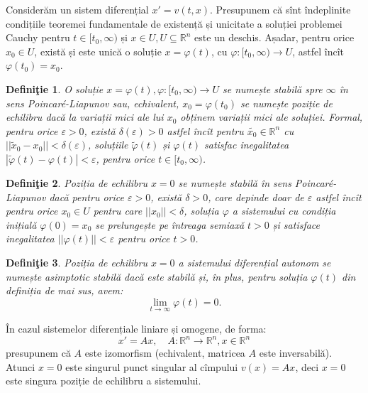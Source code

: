 \documentclass[11pt,a4paper]{article}
\newcommand\seq{\subseteq}
\newcommand\RR{\mathbb{R}}
\theoremstyle{dotless}
\theoremstyle{dotlessdr}
\newtheorem{definition}{Defini\c{t}ie}[section]
\begin{document}
Considerăm un sistem diferențial $x' = v(t, x)$. Presupunem că sînt îndeplinite
condițiile teoremei fundamentale de existență și unicitate a soluției problemei
Cauchy pentru $t \in [t_0, \infty)$ și $x \in U, U \seq \RR^n$ este un deschis.
Așadar, pentru orice $x_0 \in U$, există și este unică o soluție $x = \varphi(t)$,
cu $\varphi : [t_0, \infty) \to U$, astfel încît $\varphi(t_0) = x_0$.

\begin{definition}\label{def:stabila-PL}
  O soluție $x = \varphi(t), \varphi : [t_0, \infty) \to U$ se numește \emph{stabilă %
    spre $\infty$ în sens Poincar\'{e}-Liapunov} sau, echivalent, $x_0 = \varphi(t_0)$
  se numește \emph{poziție de echilibru} dacă la variații mici ale lui $x_0$ obținem
  variații mici ale soluției. Formal, pentru orice $\varepsilon > 0$, există
  $\delta(\varepsilon) > 0$ astfel încît pentru $\widetilde{x_0}\in\RR^n$ cu
  $||\widetilde{x}_0 - x_0|| < \delta(\varepsilon)$, soluțiile $\widetilde{\varphi}(t)$
  și $\varphi(t)$ satisfac inegalitatea $|\widetilde{\varphi}(t) - \varphi(t)| < \varepsilon$,
  pentru orice $t \in [t_0, \infty)$.
\end{definition}

\begin{definition}\label{def:stabila-0}
  Poziția de echilibru $x = 0$ se numește \emph{stabilă în sens Poincar\'{e}-Liapunov}
  dacă pentru orice $\varepsilon > 0$, există $\delta > 0$, care depinde doar de
  $\varepsilon$ astfel încît pentru orice $x_0 \in U$ pentru care $||x_0|| < \delta$,
  soluția $\varphi$ a sistemului cu condiția inițială $\varphi(0) = x_0$ se prelungește
  pe întreaga semiaxă $t > 0$ și satisface inegalitatea $||\varphi(t)|| < \varepsilon$
  pentru orice $t > 0$.
\end{definition}

\begin{definition}\label{def:as-stabila}
  Poziția de echilibru $x = 0$ a sistemului diferențial autonom se numește
  \emph{asimptotic stabilă} dacă este stabilă și, în plus, pentru soluția $\varphi(t)$
  din definiția de mai sus, avem:
  \[
    \lim_{t \to \infty} \varphi(t) = 0.
  \]
\end{definition}

În cazul sistemelor diferențiale liniare și omogene, de forma:
\[
  x' = Ax, \quad A : \RR^n \to \RR^n, x \in \RR^n
\]
presupunem că $A$ este izomorfism (echivalent, matricea $A$ este inversabilă).
Atunci $x = 0$ este singurul punct singular al cîmpului $v(x) = Ax$, deci $x = 0$
este singura poziție de echilibru a sistemului.
\end{document}

